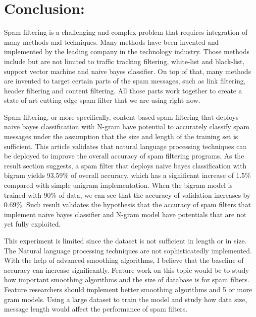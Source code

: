 \documentclass{article}
\begin{document}
\section{Conclusion:}

Spam filtering is a challenging and complex problem that requires integration of many methods and techniques. Many methods have been invented and implemented by the leading company in the technology industry. Those methods include but are not limited to traffic tracking filtering, white-list and black-list, support vector machine and naive bayes classifier. On top of that, many methods are invented to target certain parts of the spam messages, such as link filtering, header filtering and content filtering. All those parts work together to create a state of art cutting edge spam filter that we are using right now. 


Spam filtering, or more specifically, content based spam filtering that deploys naive bayes classification with N-gram have potential to accurately classify spam messages under the assumption that the size and length of the training set is sufficient.  This article validates that natural language processing techniques can be deployed to improve the overall accuracy of spam filtering programs. As the result section suggests, a spam filter that deploys naive bayes classification with bigram yields 93.59\% of overall accuracy, which has a significant increase of 1.5\% compared with simple unigram implementation.  When the bigram model is trained with 90\% of data, we can see that the accuracy of validation increases by 0.69\%. Such result validates the hypothesis that the accuracy of spam filters that implement naive bayes classifier and N-gram model have potentials that are not yet fully exploited. 


This experiment is limited since the dataset is not sufficient in length or in size. The Natural language processing techniques are not sophisticatedly implemented. With the help of advanced smoothing algorithms, I believe that the baseline of accuracy can increase significantly. 
Feature work on this topic would be to study how important smoothing algorithms and the size of database is for spam filters. Feature researchers should implement better smoothing algorithms and 5 or more gram models. Using a large dataset to train the model and study how data size, message length would affect the performance of spam filters. 

\newpage
\medskip


\end{document}
